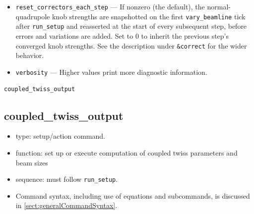 \documentclass[11pt]{article}
\begin{document}
\begin{itemize}
  correction routine appends a new page; rows within a page are indexed
  by \verb|Iteration|, where 0 is the state before any correction is
  applied and $k+1$ is the state after iteration $k$ has been measured.
  Columns are \verb|Iteration| (long), \verb|BetaxRms|, \verb|BetayRms|,
  \verb|EtaxRms| (each the RMS of the corresponding observable's residual
  $\sqrt{\sum_i (o_i - o_{i,\mathrm{target}})^2 / n_{\mathrm{BPM}}}$, in
  meters, unweighted), and \verb|WeightedRms| (the RMS of the weighted
  residual that the SVD solver actually drives down).  The per-channel
  weights in effect for the page are also recorded as parameters
  \verb|BetaxWeight|, \verb|BetayWeight|, \verb|EtaxWeight|.
\item \verb|reset_correctors_each_step| --- If nonzero (the default), the
  normal-quadrupole knob strengths are snapshotted on the first
  \verb|vary_beamline| tick after \verb|run_setup| and reasserted at the start of
  every subsequent step, before errors and variations are added.  Set to 0 to
  inherit the previous step's converged knob strengths.  See the description
  under \verb|&correct| for the wider behavior.
\item \verb|verbosity| --- Higher values print more diagnostic information.
\end{itemize}

\newpage
\begin{center}{\Large\verb|coupled_twiss_output|}\end{center}
\subsection{coupled\_twiss\_output \label{subsec:coupledtwissoutput}}

\begin{itemize}
\item type: setup/action command.
\item function: set up or execute computation of coupled twiss parameters and beam sizes
\item sequence: must follow \verb|run_setup|.
\item Command syntax, including use of equations and subcommands, is discussed in \ref{sect:generalCommandSyntax}.
\end{itemize}
\end{document}
